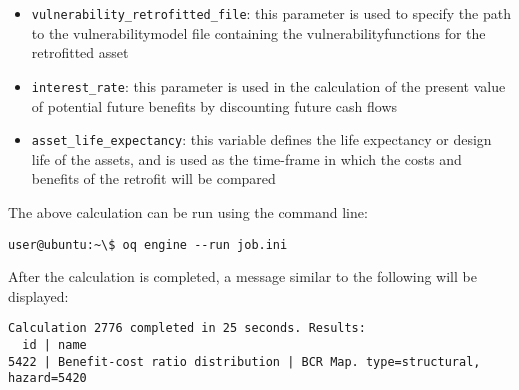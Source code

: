 \begin{itemize}

  \item \Verb+vulnerability_retrofitted_file+: this parameter is used to
    specify the path to the \gls{vulnerabilitymodel} file containing the
    \glspl{vulnerabilityfunction} for the retrofitted asset

  \item \Verb+interest_rate+: this parameter is used in the calculation of the
    present value of potential future benefits by discounting future cash flows

  \item \Verb+asset_life_expectancy+: this variable defines the life
    expectancy or design life of the assets, and is used as the time-frame in
    which the costs and benefits of the retrofit will be compared

\end{itemize}

The above calculation can be run using the command line:

\begin{verbatim}
user@ubuntu:~\$ oq engine --run job.ini
\end{verbatim}

After the calculation is completed, a message similar to the following will be
displayed:

\begin{verbatim}
Calculation 2776 completed in 25 seconds. Results:
  id | name
5422 | Benefit-cost ratio distribution | BCR Map. type=structural, hazard=5420
\end{verbatim}